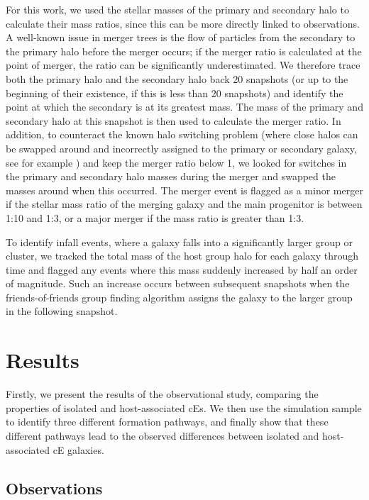 \documentclass[a4paper,fleqn,usenatbib]{mnras}
\begin{document}
For this work, we used the stellar masses of the primary and secondary halo to calculate their mass ratios, since this can be more directly linked to observations. A well-known issue in merger trees is the flow of particles from the secondary to the primary halo before the merger occurs; if the merger ratio is calculated at the point of merger, the ratio can be significantly underestimated. We therefore trace both the primary halo and the secondary halo back 20 snapshots (or up to the beginning of their existence, if this is less than 20 snapshots) and identify the point at which the secondary is at its greatest mass. The mass of the primary and secondary halo at this snapshot is then used to calculate the merger ratio. In addition, to counteract the known halo switching problem (where close halos can be swapped around and incorrectly assigned to the primary or secondary galaxy, see for example \citet{2017MNRAS.472.3659P}) and keep the merger ratio below 1, we looked for switches in the primary and secondary halo masses during the merger and swapped the masses around when this occurred. The merger event is flagged as a minor merger if the stellar mass ratio of the merging galaxy and the main progenitor is between 1:10 and 1:3, or a major merger if the mass ratio is greater than 1:3.

To identify infall events, where a galaxy falls into a significantly larger group or cluster, we tracked the total mass of the host group halo for each galaxy through time and flagged any events where this mass suddenly increased by half an order of magnitude. Such an increase occurs between subsequent snapshots when the friends-of-friends group finding algorithm assigns the galaxy to the larger group in the following snapshot.




\section{Results}

Firstly, we present the results of the observational study, comparing the properties of isolated and host-associated cEs. We then use the simulation sample to identify three different formation pathways, and finally show that these different pathways lead to the observed differences between isolated and host-associated cE galaxies.

\subsection{Observations}
\end{document}
